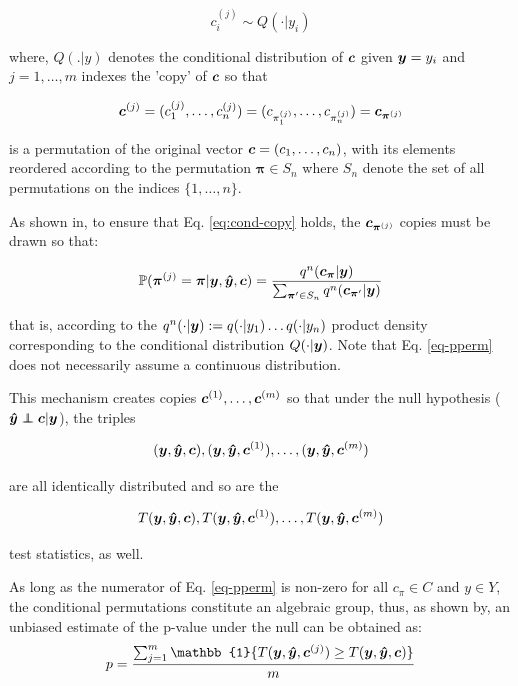 \documentclass{article}
\begin{document}
\begin{equation}
    c_i^{(j)} \sim Q(\cdot|y_i)
     \label{eq:cond-copy}
\end{equation}

where, $Q(.|y)$ denotes the conditional distribution of $\boldsymbol{c}$ given $\boldsymbol{y}=y_i$ and $j=1,\dots, m$ indexes the 'copy' of $\boldsymbol{c}$ so that

$$ \boldsymbol{c}^{(j)} = (c_1^{(j)}, \dots, c_n^{(j)}) = (c_{\pi_1^{(j)}}, \dots, c_{\pi_n^{(j)}}) =  \boldsymbol{c}_{\boldsymbol{\pi}^{(j)}} $$

is a permutation of the original vector $\boldsymbol{c} = (c_1, \dots, c_n)$, with its elements reordered according to the permutation $ \boldsymbol{\pi} \in S_n$ where $S_n$ denote the set of all permutations on the indices $\{1,\dots,n\}$.

As shown in\citep{berrett2020conditional}, to ensure that Eq. \ref{eq:cond-copy} holds, the $\boldsymbol{c}_{\boldsymbol{\pi}^{(j)}}$ copies must be drawn so that:

\begin{equation}
    \label{eq-pperm}
    \mathbb{P}(\boldsymbol{ \pi }^{(j)} = \boldsymbol{ \pi } | \boldsymbol{y},\boldsymbol{\hat{y}},\boldsymbol{c}) = \frac{q^n(\boldsymbol{c}_{\boldsymbol{ \pi }} | \boldsymbol{y})}{\sum_{\boldsymbol{ \pi } ' \in S_n} q^n(\boldsymbol{c}_{\boldsymbol{ \pi } ' } | \boldsymbol{y})}
\end{equation}


that is, according to the $q^n(\cdot|\boldsymbol{y}) := q(\cdot | y_1) \dots q(\cdot|y_n)$ product density corresponding to the conditional distribution $Q(\cdot|\boldsymbol{y})$. Note that Eq. \ref{eq-pperm} does not necessarily assume a continuous distribution.

This mechanism creates copies $\boldsymbol{c}^{(1)}, \dots ,\boldsymbol{c}^{(m)}$ so that under the null hypothesis ($\yhat \independent \c | \y$), the triples 

$$(\boldsymbol{y},\boldsymbol{\hat{y}},\boldsymbol{c}), (\boldsymbol{y}, \boldsymbol{\hat{y}}, \boldsymbol{c}^{(1)}),\dots, (\boldsymbol{y}, \boldsymbol{\hat{y}}, \boldsymbol{c}^{(m)})$$

are all identically distributed and so are the 

$$T(\boldsymbol{y},\boldsymbol{\hat{y}},\boldsymbol{c}), T(\boldsymbol{y}, \boldsymbol{\hat{y}}, \boldsymbol{c}^{(1)}),\dots,T(\boldsymbol{y}, \boldsymbol{\hat{y}}, \boldsymbol{c}^{(m)})$$

test statistics, as well.

As long as the numerator of Eq. \ref{eq-pperm} is non-zero for all $c_\pi \in C$ and $y \in Y$, the conditional permutations constitute an algebraic group, thus, as shown by\citep{hemerik2018exact}, an unbiased estimate of the p-value under the null can be obtained as:
$$ p= \frac{\sum_{j=1}^m \mathbb{1} \{T(\y, \yhat, \c^{(j)}) \geq T(\y, \yhat, \c) \}  }{m}$$
\end{document}
